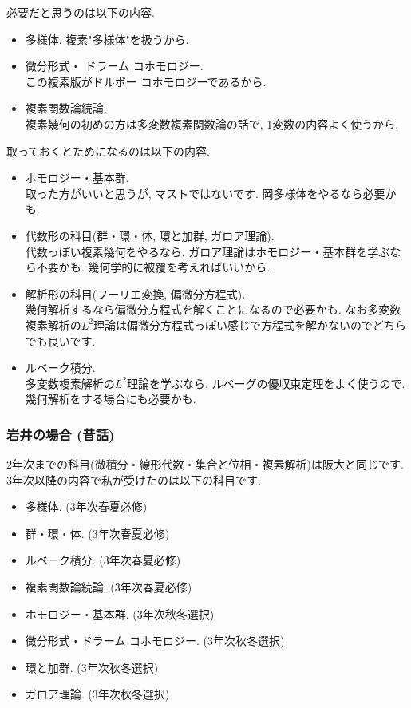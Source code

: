 必要だと思うのは以下の内容.
\vspace{-8pt}
\begin{itemize}[left=0pt]
  \setlength{\parskip}{0cm} %
  \setlength{\itemsep}{5pt} %
  \item 多様体. 複素"多様体"を扱うから. 
   \item 微分形式・ ドラーム コホモロジー. \\ この複素版がドルボー コホモロジーであるから.
  \item 複素関数論続論. \\ 複素幾何の初めの方は多変数複素関数論の話で, 1変数の内容よく使うから.
  \end{itemize}
取っておくとためになるのは以下の内容. 
\vspace{-8pt}
\begin{itemize}[left=0pt]
  \setlength{\parskip}{0cm} %
  \setlength{\itemsep}{5pt} %
  \item ホモロジー・基本群. 　\\ 取った方がいいと思うが, マストではないです. 岡多様体をやるなら必要かも. 
  \item 代数形の科目(群・環・体, 環と加群, ガロア理論). \\ 代数っぽい複素幾何をやるなら. ガロア理論はホモロジー・基本群を学ぶなら不要かも. 幾何学的に被覆を考えればいいから. %
 \item 解析形の科目(フーリエ変換, 偏微分方程式). \\  幾何解析するなら偏微分方程式を解くことになるので必要かも. なお多変数複素解析の$L^2$理論は偏微分方程式っぽい感じで方程式を解かないのでどちらでも良いです. 
  \item ルベーク積分.  \\ 多変数複素解析の$L^2$理論を学ぶなら. ルベーグの優収束定理をよく使うので. 幾何解析をする場合にも必要かも. 
    \end{itemize}


\subsubsection{岩井の場合 (昔話)}
2年次までの科目(微積分・線形代数・集合と位相・複素解析)は阪大と同じです. 
3年次以降の内容で私が受けたのは以下の科目です. 
\vspace{-8pt}
\begin{itemize}[left=0pt]
  \setlength{\parskip}{0cm} %
  \setlength{\itemsep}{0cm} 
 \item 多様体. (3年次春夏必修)
 \item 群・環・体. (3年次春夏必修)
 \item ルベーク積分. (3年次春夏必修)
 \item 複素関数論続論. (3年次春夏必修)
 \item ホモロジー・基本群. (3年次秋冬選択)
 \item 微分形式・ドラーム コホモロジー. (3年次秋冬選択)
 \item 環と加群. (3年次秋冬選択)
 \item ガロア理論. (3年次秋冬選択)
  \end{itemize}
  
